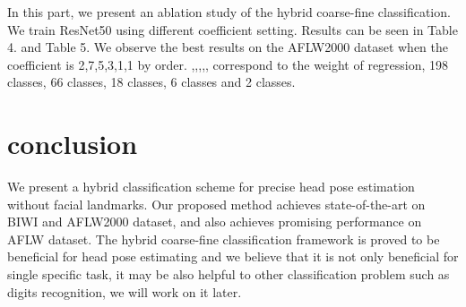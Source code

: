 \documentclass{article}
\begin{document}
\begin{CJK*}{UTF8}{gkai}
In this part, we present an ablation study of the hybrid coarse-fine classification. We train ResNet50 using different coefficient setting. Results can be seen in Table 4. and Table 5. We observe the best results on the AFLW2000 dataset when the coefficient is 2,7,5,3,1,1 by order. ,,,,, correspond to the weight of regression, 198 classes, 66 classes, 18 classes, 6 classes and 2 classes.

\section{conclusion}
\label{sec:page}
We present a hybrid classification scheme for precise head pose estimation without facial landmarks. Our proposed method achieves state-of-the-art on BIWI and AFLW2000 dataset, and also achieves promising performance on AFLW dataset. The hybrid coarse-fine classification framework is proved to be beneficial for head pose estimating and we believe that it is not only beneficial for single specific task, it may be also helpful to other classification problem such as digits recognition, we will work on it later.

\newpage


\end{CJK*}
\end{document}
